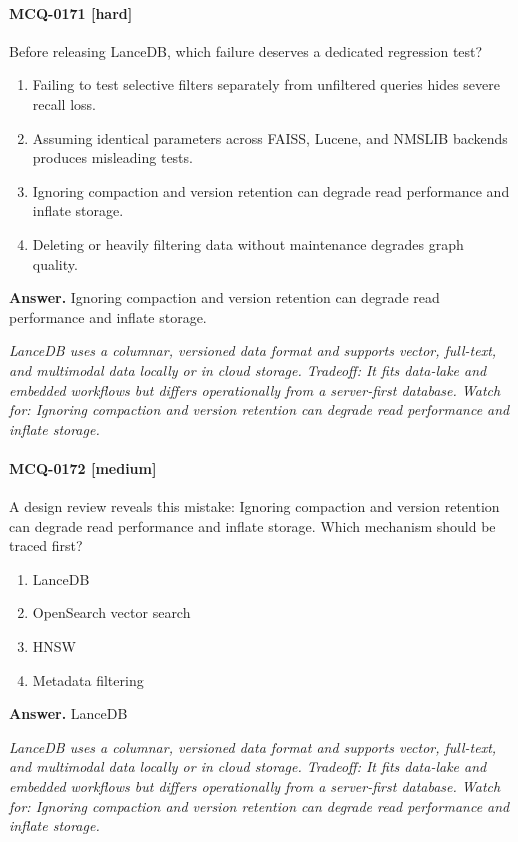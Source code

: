 \paragraph{MCQ-0171 [hard]} Before releasing LanceDB, which failure deserves a dedicated regression test?
\begin{enumerate}[label=\Alph*.]
\item Failing to test selective filters separately from unfiltered queries hides severe recall loss.
\item Assuming identical parameters across FAISS, Lucene, and NMSLIB backends produces misleading tests.
\item Ignoring compaction and version retention can degrade read performance and inflate storage.
\item Deleting or heavily filtering data without maintenance degrades graph quality.
\end{enumerate}
\noindent\textbf{Answer.} Ignoring compaction and version retention can degrade read performance and inflate storage.
\par\textit{LanceDB uses a columnar, versioned data format and supports vector, full-text, and multimodal data locally or in cloud storage. Tradeoff: It fits data-lake and embedded workflows but differs operationally from a server-first database. Watch for: Ignoring compaction and version retention can degrade read performance and inflate storage.}
\paragraph{MCQ-0172 [medium]} A design review reveals this mistake: Ignoring compaction and version retention can degrade read performance and inflate storage. Which mechanism should be traced first?
\begin{enumerate}[label=\Alph*.]
\item LanceDB
\item OpenSearch vector search
\item HNSW
\item Metadata filtering
\end{enumerate}
\noindent\textbf{Answer.} LanceDB
\par\textit{LanceDB uses a columnar, versioned data format and supports vector, full-text, and multimodal data locally or in cloud storage. Tradeoff: It fits data-lake and embedded workflows but differs operationally from a server-first database. Watch for: Ignoring compaction and version retention can degrade read performance and inflate storage.}
